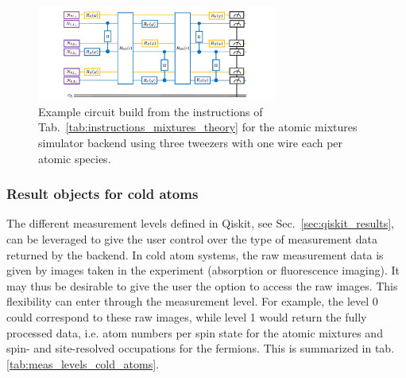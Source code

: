 \documentclass[a4paper, 10pt]{article}
\begin{document}
    \begin{figure}[htbp]
        \centering
        \includegraphics[width=0.7\textwidth]{figs/Na_Li_circuit.pdf}
        \caption{Example circuit build from the instructions of Tab.~\ref{tab:instructions_mixtures_theory} for the atomic mixtures simulator backend using three tweezers with one wire each per atomic species. 
        }
        \label{fig:NaLi_simulator_circuit}
    \end{figure}
    
    
    

\subsubsection{Result objects for cold atoms}
    
The different measurement levels defined in Qiskit, see Sec.~\ref{sec:qiskit_results}, can be leveraged to give the user control over the type of measurement data returned by the backend.
In cold atom systems, the raw measurement data is given by images taken in the experiment (absorption or fluorescence imaging).
It may thus be desirable to give the user the option to access the raw images.
This flexibility can enter through the measurement level.
For example, the level 0 could correspond to these raw images, while level 1 would return the fully processed data, i.e. atom numbers per spin state for the atomic mixtures and spin- and site-resolved occupations for the fermions.
This is summarized in tab. \ref{tab:meas_levels_cold_atoms}.
    
    
\end{document}
